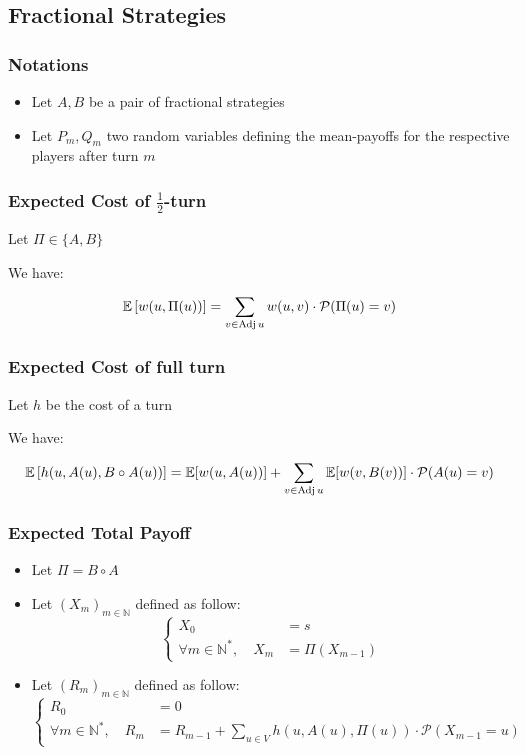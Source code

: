\subsection{Fractional Strategies}
\subsubsection{Notations}
\begin{itemize}
	\item Let $A,B$ be a pair of fractional strategies
	\item Let $P_m,Q_m$ two random variables defining the mean-payoffs for the respective players after turn $m$
	
\end{itemize}

\subsubsection{Expected Cost of $\frac{1}{2}$-turn}


Let $\Pi \in \{A,B\}$

We have:

\begin{align*}
	\mathbb{E}\left[w(u,\Pi(u))\right]&=\sum_{v\in \operatorname{Adj} u} w(u,v)\cdot \mathcal{P}(\Pi(u)=v) \\
\end{align*}
\subsubsection{Expected Cost of full turn}

Let $h$ be the cost of a turn

We have:

\begin{align*}
	\mathbb{E}\left[h(u,A(u),B \circ A(u))\right]&= \mathbb{E}[w(u,A(u))]+\sum_{v\in \operatorname{Adj} u} \mathbb{E}[w(v,B(v))]\cdot \mathcal{P}(A(u)=v) \\
\end{align*}

\subsubsection{Expected Total Payoff}

\begin{itemize}
	\item Let $\Pi=B\circ A$
	\item Let $(X_m)_{m\in\mathbb{N}}$ defined as follow:$$
	\begin{cases}
		X_0&=s\\
		\forall m\in\mathbb{N}^*,\quad X_m&= \Pi(X_{m-1})
	\end{cases}
	$$
	\item Let $(R_m)_{m\in\mathbb{N}}$ defined as follow: $$
	\begin{cases}
		R_0&=0\\
		\forall m\in\mathbb{N}^*,\quad  R_m&= R_{m-1}+\displaystyle\sum_{u\in V}h(u,A(u),\Pi(u)) \cdot \mathcal{P}(X_{m-1}=u)
	\end{cases}
	$$
\end{itemize}


